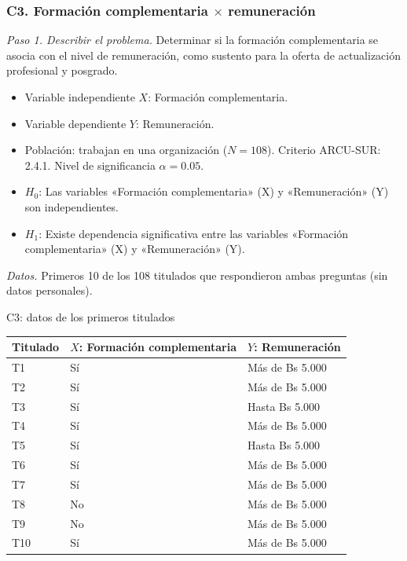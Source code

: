 \subsubsection*{C3. Formación complementaria $\times$ remuneración}

\textit{Paso 1. Describir el problema.} Determinar si la formación complementaria se asocia con el nivel de remuneración, como sustento para la oferta de actualización profesional y posgrado.

\begin{itemize}[nosep]
  \item Variable independiente $X$: Formación complementaria.
  \item Variable dependiente $Y$: Remuneración.
  \item Población: trabajan en una organización ($N = 108$). Criterio ARCU-SUR: 2.4.1. Nivel de significancia $\alpha = 0.05$.
  \item $H_0$: Las variables «Formación complementaria» (X) y «Remuneración» (Y) son independientes.
  \item $H_1$: Existe dependencia significativa entre las variables «Formación complementaria» (X) y «Remuneración» (Y).
\end{itemize}

\textit{Datos.} Primeros 10 de los 108 titulados que respondieron ambas preguntas (sin datos personales).

\begin{mitabla}{C3: datos de los primeros titulados}
\begin{tabular}{lll}
\toprule
Titulado & $X$: Formación complementaria & $Y$: Remuneración \\
\midrule
T1 & Sí & Más de Bs 5.000 \\
T2 & Sí & Más de Bs 5.000 \\
T3 & Sí & Hasta Bs 5.000 \\
T4 & Sí & Más de Bs 5.000 \\
T5 & Sí & Hasta Bs 5.000 \\
T6 & Sí & Más de Bs 5.000 \\
T7 & Sí & Más de Bs 5.000 \\
T8 & No & Más de Bs 5.000 \\
T9 & No & Más de Bs 5.000 \\
T10 & Sí & Más de Bs 5.000 \\
\bottomrule
\end{tabular}
\end{mitabla}

